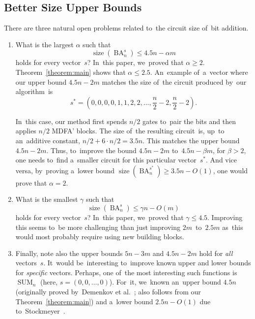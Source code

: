 \documentclass[sigconf, review, anonymous]{acmart}
\DeclareMathOperator{\SUM}{SUM}
\DeclareMathOperator{\BA}{BA}
\DeclareMathOperator{\size}{size}
\begin{document}
\subsection{Better Size Upper Bounds}
There are three natural open problems related to~the circuit size of~bit addition.
\begin{enumerate}
	\item What is the largest $\alpha$ such that 
	\[\size(\BA_n^s) \le 4.5n-\alpha m\]
	holds for every vector~$s$? In~this paper, we~proved that $\alpha \ge 2$.
	Theorem~\ref{theorem:main} shows that $\alpha \le 2.5$. An~example 
	of~a~vector where our upper bound $4.5n-2m$ matches the size of~the circuit 
	produced by~our algorithm~is
	\[s^*=\left(0,0,0,0,1,1,2,2,\dotsc,\frac{n}{2}-2, \frac{n}{2}-2\right).\]
	\begin{center}
	\end{center}
	In~this case, our method first spends $n/2$ gates to~pair the bits and then applies $n/2$ MDFA' blocks. The size of~the resulting circuit~is, up~to an~additive constant, $n/2+6\cdot n/2=3.5n$. This matches the upper bound $4.5n-2m$. Thus, to~improve the bound $4.5n-2m$ to~$4.5n-\beta m$, for $\beta > 2$, one needs to~find a~smaller circuit for this particular vector~$s^*$.
	And vice versa, by~proving a~lower bound $\size(\BA_n^{s^*}) \ge 3.5n-O(1)$,
	one would prove that $\alpha=2$.
	
	\item What is the smallest $\gamma$ such that 
	\[\size(\BA_n^s) \le \gamma n-O(m)\]
	holds for every vector~$s$? In~this paper,
	we~proved that $\gamma \le 4.5$.
	Improving this seems to~be more challenging than just improving $2m$~to~$2.5m$ as~this would most probably require using new building blocks. 
	
	\item Finally, note also the upper bounds $5n-3m$ and $4.5n-2m$ hold for \emph{all} vectors~$s$.
	It~would be~interesting to~improve known upper and lower bounds for \emph{specific} vectors. Perhaps, one of~the most interesting such functions is~$\SUM_n$ (here, $s=(0,0,\dotsc,0)$). For~it, we~known an~upper bound $4.5n$ (originally proved 
	by~Demenkov et al.~\cite{DBLP:journals/ipl/DemenkovKKY10}; also follows from our Theorem~\ref{theorem:main}) and a~lower bound $2.5n-O(1)$ due to~Stockmeyer~\cite{DBLP:journals/mst/Stockmeyer77}. 
\end{enumerate}
\end{document}
